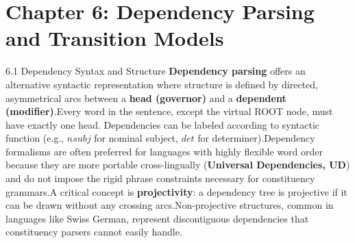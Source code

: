 \documentclass{article}
\begin{document}
\section{Chapter 6: Dependency Parsing and Transition Models}
6.1 Dependency Syntax and Structure
\textbf{Dependency parsing} offers an alternative syntactic representation where structure is defined by directed, asymmetrical arcs between a \textbf{head (governor)} and a \textbf{dependent (modifier)}.\footnotemark[1] Every word in the sentence, except the virtual ROOT node, must have exactly one head. Dependencies can be labeled according to syntactic function (e.g., $nsubj$ for nominal subject, $det$ for determiner).\footnotemark[1]
Dependency formalisms are often preferred for languages with highly flexible word order because they are more portable cross-lingually (\textbf{Universal Dependencies, UD}) and do not impose the rigid phrase constraints necessary for constituency grammars.\footnotemark[1] A critical concept is \textbf{projectivity}: a dependency tree is projective if it can be drawn without any crossing arcs.\footnotemark[1] Non-projective structures, common in languages like Swiss German, represent discontiguous dependencies that constituency parsers cannot easily handle.\footnotemark[1]
\end{document}
